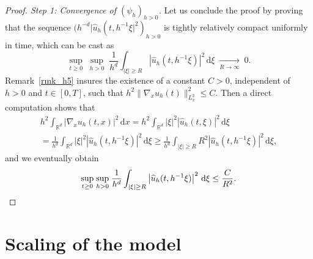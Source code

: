 \documentclass[11pt]{article}
\let\hat\oldhat
\theoremstyle{definition}
\let\hat\widehat
\newcommand{\R}{\mathbb{R}}
\newcommand{\ud}{\, {\mathrm{d}}}
\begin{document}
\begin{proof}[Proof. Step 1: Convergence of $(\psi_{h})_{h>0}$]
Let us conclude the proof by proving that the sequence $(h^{-d}|\hat{u}_{h}(t,h^{-1}\xi|^{2})_{h>0}$ is tightly relatively compact uniformly in time, which can be cast as
\[
\underset{t\geq 0}{\sup}\;\underset{h>0}{\sup}\;\frac{1}{h^{d}}\int_{|\xi|\geq R}\left|\hat{u}_{h}(t,h^{-1}\xi)\right|^{2}\ud\xi\;\underset{R\to \infty}{\to}\;0.
\]
Remark~\ref{rmk_h5} insures the existence of a constant $C>0$, independent of $h>0$ and $t\in[0,T]$, such that $h^{2}\|\nabla_{x}u_{h}(t)\|_{L_{x}^{2}}^{2}\leq C$. Then a direct computation shows that
\begin{multline*}
h^{2}\int_{\R^{d}}|\nabla_{x}u_{h}(t,x)|^{2}\ud x=h^{2}\int_{\R^{d}}|\xi|^{2}\left|\hat{u}_{h}(t,\xi)\right|^{2}\ud\xi\\
=\frac{1}{h^{d}}\int_{\R^{d}}|\xi|^{2}\left|\hat{u}_{h}(t,h^{-1}\xi)\right|^{2}\ud\xi\geq\frac{1}{h^{d}}\int_{|\xi|\geq R}R^{2}\left|\hat{u}_{h}(t,h^{-1}\xi)\right|^{2}\ud\xi,
\end{multline*}
and we eventually obtain
\[
\underset{t\geq 0}{\sup}\;\underset{h>0}{\sup}\;\frac{1}{h^{d}}\int_{|\xi|\geq R}\left|\hat{u}_{h}(t,h^{-1}\xi)\right|^{2}\ud\xi\leq \frac{C}{R^{2}}.\qedhere
\]
\end{proof}

\section{Scaling of the model}\label{adim}
\end{document}
